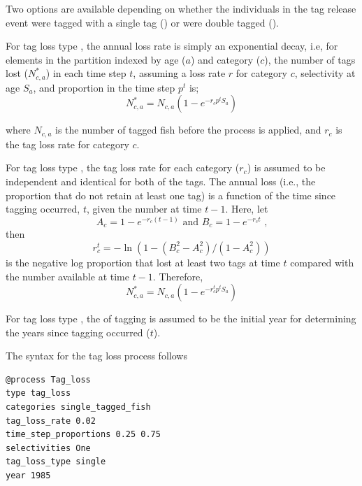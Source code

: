 Two options are available depending on whether the individuals in the tag release event were tagged with a single tag () or were double tagged ().

For tag loss type , the annual loss rate is simply an exponential decay, i.e, for elements in the partition indexed by age ($a$) and category ($c$), the number of tags lost ($N^*_{c,a}$) in each time step $t$, assuming a loss rate $r$ for category $c$, selectivity at age $S_a$, and proportion in the time step $p^t$ is; 
\begin{equation}
	N^*_{c,a} = N_{c,a} (1 -e^{-r_c p^t S_a})
\end{equation}

where $N_{c,a}$ is the number of tagged fish before the process is applied, and $r_c$ is the tag loss rate for category $c$.

For tag loss type , the tag loss rate  for each category ($r_c$) is assumed to be independent and identical for both of the tags. The annual loss (i.e., the proportion that do not retain at least one tag) is a function of the time since tagging occurred, $t$, given the number at time $t-1$. Here, let
\begin{equation}
	A_c = 1-e^{-r_c (t-1)} \text{\ and\ }
	B_c = 1-e^{-r_c t} \text{\ ,} 
\end{equation}
then 
\begin{equation}
	r^t_c = -\ln(1 - (B^2_c - A^2_c) / (1-A^2_c))
\end{equation}
is the negative log proportion that lost at least two tags at time $t$ compared with the number available at time $t-1$. Therefore, 
\begin{equation}
	N^*_{c,a} = N_{c,a} (1-e^{-r^t_c p^t S_a})
\end{equation}

For tag loss type , the  of tagging is assumed to be the initial year for determining the years since tagging occurred ($t$).

The syntax for the tag loss process follows

{\small{\begin{verbatim}
@process Tag_loss
type tag_loss
categories single_tagged_fish
tag_loss_rate 0.02
time_step_proportions 0.25 0.75
selectivities One
tag_loss_type single
year 1985
\end{verbatim}}}

